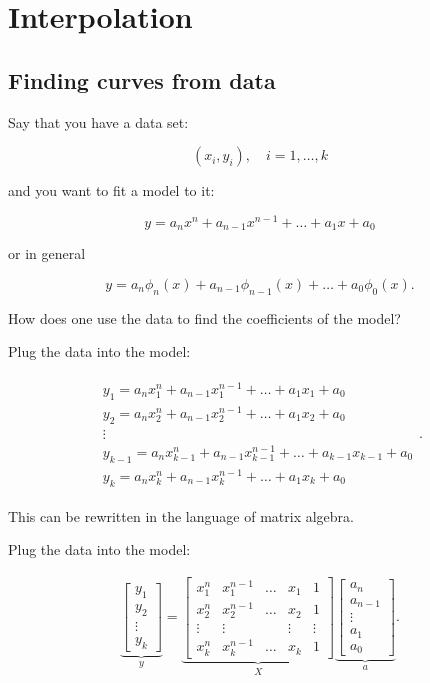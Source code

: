 \hypertarget{interpolation}{%
\section{Interpolation}\label{interpolation}}

\hypertarget{finding-curves-from-data}{%
\subsection{Finding curves from data}\label{finding-curves-from-data}}

Say that you have a data set:

\[(x_i, y_i),\quad  i=1, \dots, k\]

and you want to fit a model to it:

\[y = a_n x^n + a_{n-1}x^{n-1} + \dots + a_1x + a_0\]

or in general

\[y = a_n \phi_n(x) + a_{n-1}\phi_{n-1}(x) + \dots + a_0 \phi_0(x) .\]

How does one use the data to find the coefficients of the model?

Plug the data into the model:

\[\begin{aligned}
\begin{array}{l}
 y_1 = a_n x_1^n + a_{n-1}x_1^{n-1} + \dots + a_1x_1 + a_0 \\[3mm]
 y_2 = a_n x_2^n + a_{n-1}x_2^{n-1} + \dots + a_1x_2 + a_0 \\[3mm]
\vdots \\[3mm]
 y_{k-1} = a_n x_{k-1}^n + a_{n-1}x_{k-1}^{n-1} + \dots + a_{k-1}x_{k-1} + a_0 \\[3mm]
 y_k = a_n x_k^n + a_{n-1}x_k^{n-1} + \dots + a_1x_k + a_0
\end{array} .
\end{aligned}\]

This can be rewritten in the language of matrix algebra.

Plug the data into the model:

\[\begin{aligned}
\underbrace{\begin{bmatrix} y_1 \\[3mm] y_2 \\[3mm] \vdots \\[3mm] y_k \end{bmatrix}}_y =
\underbrace{ \begin{bmatrix} x_1^n & x_1^{n-1} & \dots & x_1 & 1 \\[3mm]
x_2^n & x_2^{n-1} & \dots & x_2 & 1 \\[3mm]
\vdots &\vdots & & \vdots & \vdots\\[3mm]
x_k^n & x_k^{n-1} & \dots & x_k & 1
\end{bmatrix} }_X
\underbrace{\begin{bmatrix}
a_n \\[3mm] a_{n-1} \\[3mm] \vdots \\[3mm] a_1 \\[3mm] a_0
\end{bmatrix}}_a     .
\end{aligned}\]

